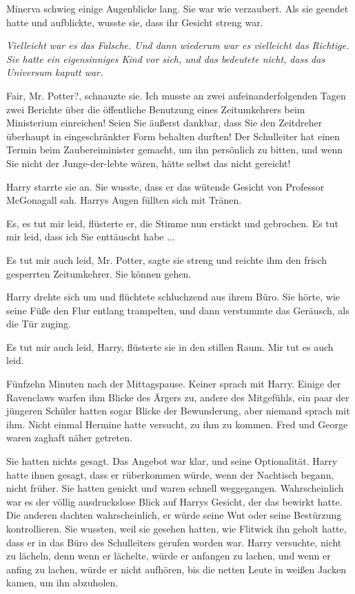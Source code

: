 Minerva schwieg einige Augenblicke lang. Sie war wie verzaubert. Als sie geendet
hatte und aufblickte, wusste sie, dass ihr Gesicht streng war.

\emph{Vielleicht war es das Falsche. Und dann wiederum war es vielleicht das
Richtige. Sie hatte ein eigensinniges Kind vor sich, und das bedeutete nicht,
dass das Universum kaputt war.}

\glqq{}Fair, Mr. Potter?\grqq{}, schnauzte sie. \glqq{}Ich musste an zwei
aufeinanderfolgenden Tagen zwei Berichte über die öffentliche Benutzung eines
Zeitumkehrers beim Ministerium einreichen! Seien Sie äußerst dankbar, dass Sie
den Zeitdreher überhaupt in eingeschränkter Form behalten durften! Der
Schulleiter hat einen Termin beim Zaubereiminister gemacht, um ihn persönlich zu
bitten, und wenn Sie nicht der Junge-der-lebte wären, hätte selbst das nicht
gereicht!\grqq{}

Harry starrte sie an. Sie wusste, dass er das wütende Gesicht von Professor
McGonagall sah. Harrys Augen füllten sich mit Tränen.

\glqq{}Es, es tut mir leid\grqq{}, flüsterte er, die Stimme nun erstickt und
gebrochen. \glqq{}Es tut mir leid, dass ich Sie enttäuscht habe ...\grqq{}

\glqq{}Es tut mir auch leid, Mr. Potter\grqq{}, sagte sie streng und reichte ihm
den frisch gesperrten Zeitumkehrer. \glqq{}Sie können gehen.\grqq{}

Harry drehte sich um und flüchtete schluchzend aus ihrem Büro. Sie hörte, wie
seine Füße den Flur entlang trampelten, und dann verstummte das Geräusch, als
die Tür zuging.

\glqq{}Es tut mir auch leid, Harry\grqq{}, flüsterte sie in den stillen Raum.
\glqq{}Mir tut es auch leid.\grqq{}

Fünfzehn Minuten nach der Mittagspause. Keiner sprach mit Harry. Einige der
Ravenclaws warfen ihm Blicke des Ärgers zu, andere des Mitgefühls, ein paar der
jüngeren Schüler hatten sogar Blicke der Bewunderung, aber niemand sprach mit
ihm. Nicht einmal Hermine hatte versucht, zu ihm zu kommen. Fred und George
waren zaghaft näher getreten.

Sie hatten nichts gesagt. Das Angebot war klar, und seine Optionalität. Harry
hatte ihnen gesagt, dass er rüberkommen würde, wenn der Nachtisch begann, nicht
früher. Sie hatten genickt und waren schnell weggegangen. Wahrscheinlich war es
der völlig ausdruckslose Blick auf Harrys Gesicht, der das bewirkt hatte. Die
anderen dachten wahrscheinlich, er würde seine Wut oder seine Bestürzung
kontrollieren. Sie wussten, weil sie gesehen hatten, wie Flitwick ihn geholt
hatte, dass er in das Büro des Schulleiters gerufen worden war. Harry versuchte,
nicht zu lächeln, denn wenn er lächelte, würde er anfangen zu lachen, und wenn
er anfing zu lachen, würde er nicht aufhören, bis die netten Leute in weißen
Jacken kamen, um ihn abzuholen.

